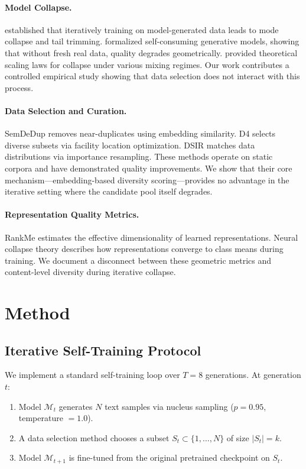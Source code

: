 \documentclass[11pt]{article}
\begin{document}
\paragraph{Model Collapse.}
\citet{shumailov2024nature} established that iteratively training on model-generated data leads to mode collapse and tail trimming. \citet{alemohammad2024selfconsuming} formalized self-consuming generative models, showing that without fresh real data, quality degrades geometrically. \citet{dohmatob2024tale} provided theoretical scaling laws for collapse under various mixing regimes. Our work contributes a controlled empirical study showing that data selection does not interact with this process.

\paragraph{Data Selection and Curation.}
SemDeDup \citep{abbas2023semdedup} removes near-duplicates using embedding similarity. D4 \citep{tirumala2023d4} selects diverse subsets via facility location optimization. DSIR \citep{xie2023dsir} matches data distributions via importance resampling. These methods operate on static corpora and have demonstrated quality improvements. We show that their core mechanism---embedding-based diversity scoring---provides no advantage in the iterative setting where the candidate pool itself degrades.

\paragraph{Representation Quality Metrics.}
RankMe \citep{garrido2023rankme} estimates the effective dimensionality of learned representations. Neural collapse theory \citep{papyan2020prevalence} describes how representations converge to class means during training. We document a disconnect between these geometric metrics and content-level diversity during iterative collapse.

\section{Method}

\subsection{Iterative Self-Training Protocol}

We implement a standard self-training loop over $T = 8$ generations. At generation $t$:
\begin{enumerate}
    \item Model $\mathcal{M}_t$ generates $N$ text samples via nucleus sampling ($p = 0.95$, temperature $= 1.0$).
    \item A data selection method chooses a subset $S_t \subset \{1, \ldots, N\}$ of size $|S_t| = k$.
    \item Model $\mathcal{M}_{t+1}$ is fine-tuned from the original pretrained checkpoint on $S_t$.
\end{enumerate}
\end{document}
